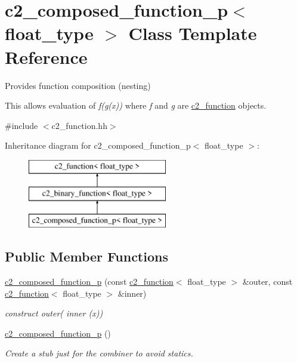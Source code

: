 \hypertarget{classc2__composed__function__p}{\section{c2\-\_\-composed\-\_\-function\-\_\-p$<$ float\-\_\-type $>$ Class Template Reference}
\label{classc2__composed__function__p}
}


Provides function composition (nesting)

This allows evaluation of {\itshape f(g(x))} where {\itshape f} and {\itshape g} are \hyperlink{classc2__function}{c2\-\_\-function} objects.  




{\ttfamily \#include $<$c2\-\_\-function.\-hh$>$}

Inheritance diagram for c2\-\_\-composed\-\_\-function\-\_\-p$<$ float\-\_\-type $>$\-:\begin{figure}[H]
\begin{center}
\leavevmode
\includegraphics[height=3.000000cm]{classc2__composed__function__p}
\end{center}
\end{figure}
\subsection*{Public Member Functions}
\begin{DoxyCompactItemize}
\item 
\hyperlink{classc2__composed__function__p_a45b7f7de47d2c363d51aa4f953e85edf}{c2\-\_\-composed\-\_\-function\-\_\-p} (const \hyperlink{classc2__function}{c2\-\_\-function}$<$ float\-\_\-type $>$ \&outer, const \hyperlink{classc2__function}{c2\-\_\-function}$<$ float\-\_\-type $>$ \&inner)
\begin{DoxyCompactList}\small\item\em construct {\itshape outer}( {\itshape inner} (x)) \end{DoxyCompactList}\item 
\hypertarget{classc2__composed__function__p_a5a1db2d4db6b02e054034452be85be06}{\hyperlink{classc2__composed__function__p_a5a1db2d4db6b02e054034452be85be06}{c2\-\_\-composed\-\_\-function\-\_\-p} ()}\label{classc2__composed__function__p_a5a1db2d4db6b02e054034452be85be06}

\begin{DoxyCompactList}\small\item\em Create a stub just for the combiner to avoid statics. \end{DoxyCompactList}\end{DoxyCompactItemize}
